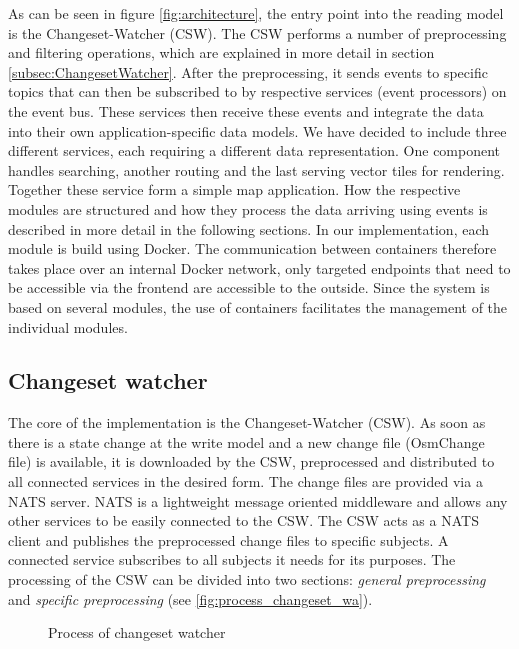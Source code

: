 \documentclass[conference]{IEEEtran}
\begin{document}
As can be seen in figure \ref{fig:architecture}, the entry point into the reading model is the Changeset-Watcher (CSW). The CSW performs a number of preprocessing and filtering operations, which are explained in more detail in section \ref{subsec:ChangesetWatcher}. After the preprocessing, it sends events to specific topics that can then be subscribed to by respective services (event processors) on the event bus. These services then receive these events and integrate the data into their own application-specific data models. We have decided to include three different services, each requiring a different data representation. 
One component handles searching, another routing and the last serving vector tiles for rendering. Together these service form a simple map application.
How the respective modules are structured and how they process the data arriving using events is described in more detail in the following sections. In our implementation, each module is build using Docker. The communication between containers therefore takes place over an internal Docker network, only targeted endpoints that need to be accessible via the frontend are accessible to the outside. Since the system is based on several modules, the use of containers facilitates the management of the individual modules.


\subsection{Changeset watcher}
The core of the implementation is the Changeset-Watcher (CSW). As soon as there is a state change at the write model and a new change file (OsmChange file) is available, it is downloaded by the CSW, preprocessed and distributed to all connected services in the desired form. The change files are provided via a NATS server. NATS \cite{noauthor_natsio_nodate}\cite{noauthor_natsdoc_nodate} is a lightweight message oriented middleware and allows any other services to be easily connected to the CSW. The CSW acts as a NATS client and publishes the preprocessed change files to specific subjects. A connected service subscribes to all subjects it needs for its purposes. The processing of the CSW can be divided into two sections: \textit{general preprocessing} and \textit{specific preprocessing} (see \autoref{fig:process_changeset_wa}).
\label{subsec:ChangesetWatcher}
\begin{figure}[h]
    \centering
    
    \caption{Process of changeset watcher}
    \label{fig:process_changeset_wa}
\end{figure}
\end{document}
